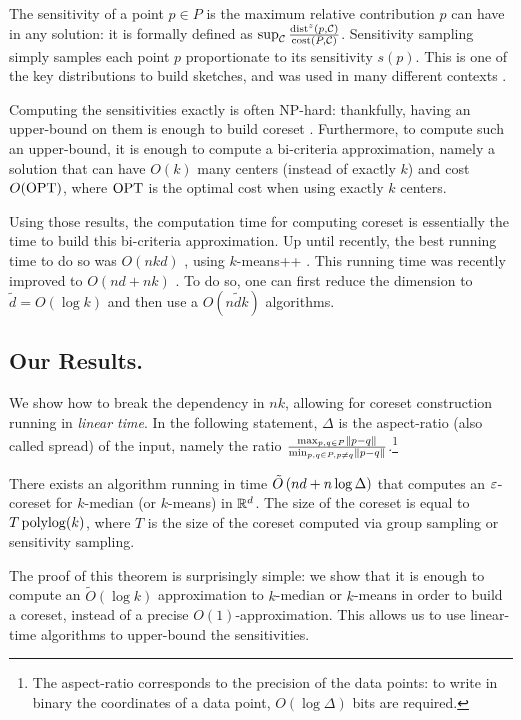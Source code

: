 The sensitivity of a point $p \in P$ is the maximum relative contribution $p$ can have in any solution: it is formally defined as $\sup_{\mathcal C} \frac{\operatorname{dist}^z(p, \mathcal C)}{\operatorname{cost}(P, \mathcal C)}$. 
Sensitivity sampling simply samples each point $p$ proportionate to its sensitivity $s(p)$. This is one of the key distributions to build sketches, and was used in many different contexts \cite{}.

Computing the sensitivities exactly is often NP-hard: thankfully, having an upper-bound on them is enough to build coreset \cite{}. Furthermore, to compute such an upper-bound, it is enough to compute a bi-criteria approximation, namely a solution that can have $O(k)$ many centers (instead of exactly $k$) and cost $O(\text{OPT})$, where $\text{OPT}$ is the optimal cost when using exactly $k$ centers. 

Using those results, the computation time for computing coreset is essentially the time to build this bi-criteria approximation. 
Up until recently, the best running time to do so was $O(nkd)$ \cite{}, using $k$-means++ \cite{}. This running time was recently improved to $O(nd + nk)$ \cite{}. 
To do so, one can first reduce the dimension to $\tilde d = O(\log k)$ and then use a $O(n \tilde d k)$ algorithms. 

\subsection{Our Results.}

We show how to break the dependency in $nk$, allowing for coreset construction running in \textit{linear time}. In the following statement, $\Delta$ is the aspect-ratio (also called spread) of the input, namely the ratio $\frac{\max_{p, q \in P} \left\| p-q\right\|}{\min_{p, q \in P, p \neq q} \left\| p-q\right\|}$.\footnote{The aspect-ratio corresponds to the precision of the data points: to write in binary the coordinates of a data point, $O(\log \Delta)$ bits are required.}

\begin{theorem}\label{thm:main}
There exists an algorithm running in time $\tilde O\left( nd + n \log \Delta\right)$  that computes an $\varepsilon$-coreset for $k$-median (or $k$-means) in $\mathbb{R}^d$. The size of the coreset is equal to $T \operatorname{polylog}(k)$, where $T$ is the size of the coreset computed via group sampling or sensitivity sampling.
\end{theorem}

The proof of this theorem is surprisingly simple: we show that it is enough to compute an $\tilde O(\log k)$ approximation to $k$-median or $k$-means in order to build a coreset, instead of a precise $O(1)$-approximation. This allows us to use linear-time algorithms to upper-bound the sensitivities.

